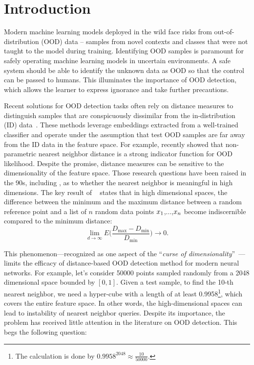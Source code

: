 \vspace{-0.3cm}
\section{Introduction}
\label{sec:intro}



Modern machine learning models deployed in the wild face risks from out-of-distribution (OOD) data -- samples from novel contexts and classes that were not taught to the model during training. Identifying OOD samples is paramount for safely operating machine learning models in uncertain environments. A safe system should be able to identify the unknown data as OOD so that the control can be passed to humans. This illuminates the importance of OOD detection, which allows the learner to express ignorance and take further precautions.

Recent solutions for OOD detection tasks often rely on distance measures to distinguish samples that are conspicuously dissimilar from the in-distribution (ID) data~\cite{lee2018simple, tack2020csi, 
 2021ssd, sun2022knn}. These methods leverage embeddings extracted from a well-trained classifier and operate under the assumption that test OOD samples are far away from the ID data in the feature space. For example, \citet{sun2022knn} recently showed that non-parametric nearest neighbor distance is a strong indicator function for OOD likelihood. Despite the promise, distance measures can be sensitive to the dimensionality of the feature space. Those research questions have been raised in the 90s,
including \citet{beyer1999nearest}, as to whether the nearest neighbor
is meaningful in high dimensions. The key result of ~\cite{beyer1999nearest} states that in high dimensional spaces, the difference between the minimum and the maximum distance between a random reference point and a list of $n$ random data points $\*x_1$,...,$\*x_n$ become indiscernible compared to the minimum distance:
\begin{equation}
    \lim_{d \rightarrow \infty} E\bigg( \frac{D_\text{max} - D_\text{min}}{D_\text{min}}\bigg) \rightarrow 0.
\end{equation}

This phenomenon---recognized as one aspect of the ``\textit{curse of dimensionality}''~\cite{beyer1999nearest, hinneburg2000nearest, aggarwal2001surprising, houle2010can, kriegel2009outlier}---limits the efficacy of distance-based OOD detection method for modern neural networks. For example, let's consider 50000 points sampled randomly from a 2048 dimensional space bounded by $[0,1]$. Given a test sample, to find the 10-th nearest neighbor, we need a hyper-cube with a length of at least 0.9958\footnote{The calculation is done by $0.9958^{2048} \approx \frac{10}{50000}$. }, which covers the entire feature space. In other words, the high-dimensional spaces can lead to instability of nearest neighbor queries. Despite its importance, the problem has received little 
attention in the literature on OOD detection. This begs the following question:

